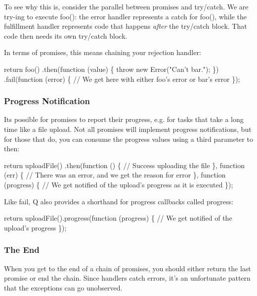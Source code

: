 To see why this is, consider the parallel between promises and {\ttfamily try}/{\ttfamily catch}. We are {\ttfamily try}-\/ing to execute {\ttfamily foo()}\+: the error handler represents a {\ttfamily catch} for {\ttfamily foo()}, while the fulfillment handler represents code that happens {\itshape after} the {\ttfamily try}/{\ttfamily catch} block. That code then needs its own {\ttfamily try}/{\ttfamily catch} block.

In terms of promises, this means chaining your rejection handler\+:


\begin{DoxyCode}
return foo()
.then(function (value) \{
    throw new Error("Can't bar.");
\})
.fail(function (error) \{
    // We get here with either foo's error or bar's error
\});
\end{DoxyCode}


\subsubsection*{Progress Notification}

It\textquotesingle{}s possible for promises to report their progress, e.\+g. for tasks that take a long time like a file upload. Not all promises will implement progress notifications, but for those that do, you can consume the progress values using a third parameter to {\ttfamily then}\+:


\begin{DoxyCode}
return uploadFile()
.then(function () \{
    // Success uploading the file
\}, function (err) \{
    // There was an error, and we get the reason for error
\}, function (progress) \{
    // We get notified of the upload's progress as it is executed
\});
\end{DoxyCode}


Like {\ttfamily fail}, Q also provides a shorthand for progress callbacks called {\ttfamily progress}\+:


\begin{DoxyCode}
return uploadFile().progress(function (progress) \{
    // We get notified of the upload's progress
\});
\end{DoxyCode}


\subsubsection*{The End}

When you get to the end of a chain of promises, you should either return the last promise or end the chain. Since handlers catch errors, it’s an unfortunate pattern that the exceptions can go unobserved.

